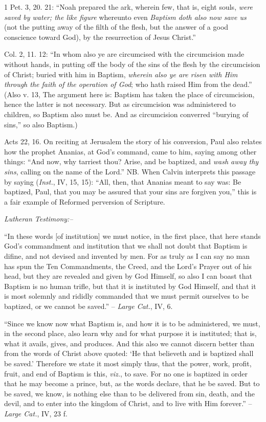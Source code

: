 \documentclass[
]{book}
\begin{document}
1 Pet. 3, 20. 21: ``Noah prepared the ark, wherein few, that is, eight souls, \emph{were saved by water; the like figure} whereunto even \emph{Baptism doth also now save us} (not the putting away of the filth of the flesh, but the answer of a good conscience toward God), by the resurrection of Jesus Christ.''

Col. 2, 11. 12: ``In whom also ye are circumcised with the circumcision made without hands, in putting off the body of the sins of the flesh by the circumcision of Christ; buried with him in Baptism, \emph{wherein also ye are risen with Him through the faith of the operation of God}; who hath raised Him from the dead.'' (Also v. 13, The argument here is: Baptism has taken the place of circumcision, hence the latter is not necessary. But as circumcision was administered to children, so Baptism also must be. And as circumcision converred ``burying of sins,'' so also Baptism.)

Acts 22, 16. On reciting at Jerusalem the story of his conversion, Paul also relates how the prophet Ananias, at God's command, came to him, saying among other things: ``And now, why tarriest thou? Arise, and be baptized, and \emph{wash away thy sins}, calling on the name of the Lord.'' NB. When Calvin interprets this passage by saying (\emph{Inst.}, IV, 15, 15): ``All, then, that Ananias meant to say was: Be baptized, Paul, that you may be assured that your sins are forgiven you,'' this is a fair example of Reformed perversion of Scripture.

\begin{center}
\textsl{Lutheran Testimony:--}
\end{center}

``In these words {[}of institution{]} we must notice, in the first place, that here stands God's commandment and institution that we shall not doubt that Baptism is difine, and not devised and invented by men. For as truly as I can say no man has spun the Ten Commandments, the Creed, and the Lord's Prayer out of his head, but they are revealed and given by God Himself, so also I can boast that Baptism is no human trifle, but that it is instituted by God Himself, and that it is most solemnly and rididly commanded that we must permit ourselves to be baptized, or we cannot be saved.'' -- \emph{Large Cat.}, IV, 6.

``Since we know now what Baptism is, and how it is to be administered, we must, in the second place, also learn why and for what purpose it is instituted; that is, what it avails, gives, and produces. And this also we cannot discern better than from the words of Christ above quoted: `He that believeth and is baptized shall be saved.' Therefore we state it most simply thus, that the power, work, profit, fruit, and end of Baptism is this, \emph{viz.}, to save. For no one is baptized in order that he may become a prince, but, as the words declare, that he be saved. But to be saved, we know, is nothing else than to be delivered from sin, death, and the devil, and to enter into the kingdom of Christ, and to live with Him forever.'' -- \emph{Large Cat.}, IV, 23 f.
\end{document}
